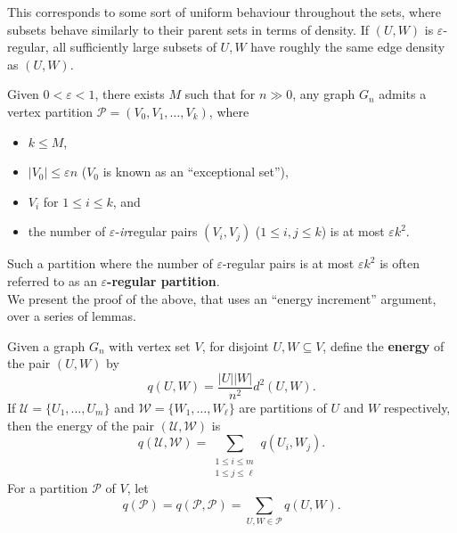 \documentclass{article}
\begin{document}
			This corresponds to some sort of uniform behaviour throughout the sets, where subsets behave similarly to their parent sets in terms of density. If $(U,W)$ is $\varepsilon$-regular, all sufficiently large subsets of $U,W$ have roughly the same edge density as $(U,W)$.

			\begin{ftheo}
				\label{theo: szemeredi's regularity lemma}
				Given $0 < \varepsilon < 1$, there exists $M$ such that for $n\gg 0$, any graph $G_n$ admits a vertex partition $\mathcal{P} = (V_0, V_1, \ldots, V_k)$, where
				\begin{itemize}
					\item $k \le M$,
					\item $|V_0| \le \varepsilon n$ ($V_0$ is known as an ``exceptional set''),
					\item $V_i$ for $1\le i\le k$, and
					\item the number of $\varepsilon$-\emph{ir}regular pairs $(V_i,V_j)$ ($1 \le i,j\le k$) is at most $\varepsilon k^2$.
				\end{itemize}
			\end{ftheo}
			Such a partition where the number of $\varepsilon$-regular pairs is at most $\varepsilon k^2$ is often referred to as an \textbf{$\varepsilon$-regular partition}.\\

			We present the proof of the above, that uses an ``energy increment'' argument, over a series of lemmas.\\

			\begin{fdef}[Energy]
				Given a graph $G_n$ with vertex set $V$, for disjoint $U,W \subseteq V$, define the \textbf{energy} of the pair $(U,W)$ by
				\[ q(U,W) = \frac{|U||W|}{n^2} d^2(U,W). \]
				If $\mathcal{U} = \{U_1,\ldots,U_m\}$ and $\mathcal{W} = \{W_1,\ldots,W_\ell\}$ are partitions of $U$ and $W$ respectively, then the energy of the pair $(\mathcal{U},\mathcal{W})$ is
				\[ q(\mathcal{U},\mathcal{W}) = \sum_{\substack{1\le i\le m \\ 1 \le j \le \ell}} q(U_i,W_j). \]
				For a partition $\mathcal{P}$ of $V$, let
				\[ q(\mathcal{P}) = q(\mathcal{P},\mathcal{P}) = \sum_{U,W\in\mathcal{P}} q(U,W) . \]
			\end{fdef}
\end{document}
